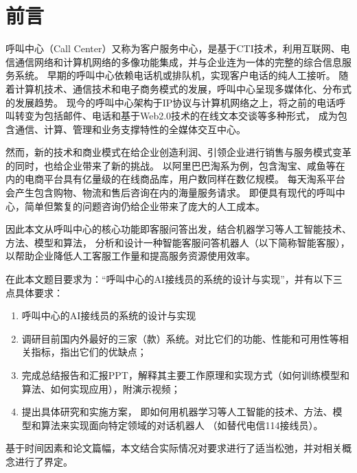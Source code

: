 \section*{前言}
\label{section:before}

呼叫中心（Call Center）又称为客户服务中心，是基于CTI技术，利用互联网、电信通信网络和计算机网络的多像功能集成，并与企业连为一体的完整的综合信息服务系统。
早期的呼叫中心依赖电话机或排队机，实现客户电话的纯人工接听。
随着计算机技术、通信技术和电子商务模式的发展，呼叫中心呈现多媒体化、分布式的发展趋势。
现今的呼叫中心架构于IP协议与计算机网络之上，将之前的电话呼叫转变为包括邮件、电话和基于Web2.0技术的在线文本交谈等多种形式，
成为包含通信、计算、管理和业务支撑特性的全媒体交互中心\citep{马晓军-1}。

然而，新的技术和商业模式在给企业创造利润、引领企业进行销售与服务模式变革的同时，也给企业带来了新的挑战。
以阿里巴巴淘系为例，包含淘宝、咸鱼等在内的电商平台具有亿量级的在线商品库，用户数同样在数亿规模。
每天淘系平台会产生包含购物、物流和售后咨询在内的海量服务请求。
即便具有现代的呼叫中心，简单但繁复的问题咨询仍给企业带来了庞大的人工成本。

因此本文从呼叫中心的核心功能即客服问答出发，结合机器学习等人工智能技术、方法、模型和算法，
分析和设计一种智能客服问答机器人（以下简称智能客服），以帮助企业降低人工客服工作量和提高服务资源使用效率。

在此本文题目要求为：“呼叫中心的AI接线员的系统的设计与实现”，并有以下三点具体要求：

\begin{enumerate}[leftmargin=3.5em,itemindent=0em,label=(\arabic*),itemsep=0pt,topsep=0pt]
    \item[\textasteriskcentered] 呼叫中心的AI接线员的系统的设计与实现
    \item 
    调研目前国内外最好的三家（款）系统。对比它们的功能、性能和可用性等相关指标，指出它们的优缺点；
    \item 
    完成总结报告和汇报PPT，解释其主要工作原理和实现方式（如何训练模型和算法、如何实现应用），附演示视频；
    \item 
    提出具体研究和实施方案，
    即如何用机器学习等人工智能的技术、方法、模型和算法来实现面向特定领域的对话机器人
    （如替代电信114接线员）。
\end{enumerate}

基于时间因素和论文篇幅，本文结合实际情况对要求进行了适当松弛，并对相关概念进行了界定。

